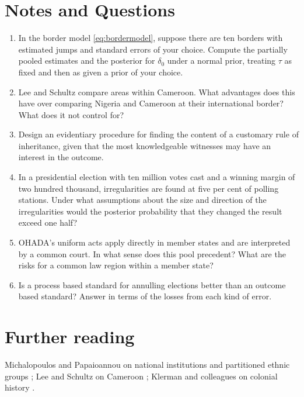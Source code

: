 \section*{Notes and Questions}
\begin{enumerate}[label=\arabic*.]
\item In the border model \eqref{eq:bordermodel}, suppose there are ten borders with estimated jumps and standard errors of your choice. Compute the partially pooled estimates and the posterior for $\delta_0$ under a normal prior, treating $\tau$ as fixed and then as given a prior of your choice.
\item Lee and Schultz compare areas within Cameroon. What advantages does this have over comparing Nigeria and Cameroon at their international border? What does it not control for?
\item Design an evidentiary procedure for finding the content of a customary rule of inheritance, given that the most knowledgeable witnesses may have an interest in the outcome.
\item In a presidential election with ten million votes cast and a winning margin of two hundred thousand, irregularities are found at five per cent of polling stations. Under what assumptions about the size and direction of the irregularities would the posterior probability that they changed the result exceed one half?
\item OHADA's uniform acts apply directly in member states and are interpreted by a common court. In what sense does this pool precedent? What are the risks for a common law region within a member state?
\item Is a process based standard for annulling elections better than an outcome based standard? Answer in terms of the losses from each kind of error.
\end{enumerate}

\section*{Further reading}
Michalopoulos and Papaioannou on national institutions and partitioned ethnic groups \citep{michalopoulos2014}; Lee and Schultz on Cameroon \citep{lee2012}; Klerman and colleagues on colonial history \citep{klerman2011}.
